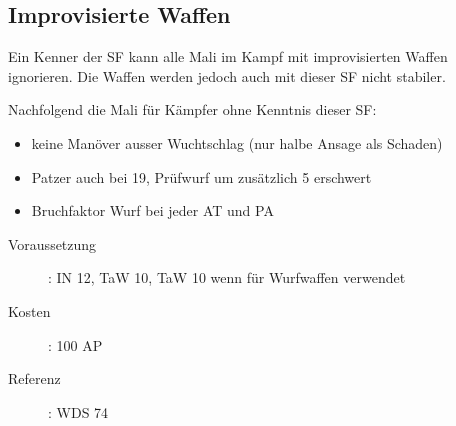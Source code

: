 \subsection{Improvisierte Waffen}
\label{sf.improvisierte_waffen}
Ein Kenner der SF  kann alle Mali im Kampf mit improvisierten Waffen ignorieren.
Die Waffen werden jedoch auch mit dieser SF nicht stabiler.

Nachfolgend die Mali für Kämpfer ohne Kenntnis dieser SF:

\begin{itemize}
    \item keine Manöver ausser Wuchtschlag (nur halbe Ansage als Schaden)
    \item Patzer auch bei 19, Prüfwurf um zusätzlich 5 erschwert
    \item Bruchfaktor Wurf bei jeder AT und PA
\end{itemize}

\begin{description}
    \item[Voraussetzung]:
        IN 12, TaW  10, TaW  10 wenn für Wurfwaffen verwendet
    \item [Kosten]:
        100 AP
    \item [Referenz]:
        WDS 74
\end{description}
